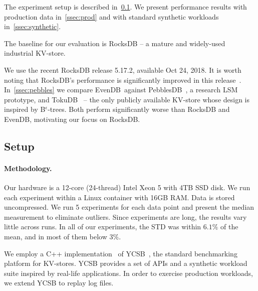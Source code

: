 \documentclass[sigplan,10pt]{acmart}
\newcommand{\remove}[1]{}
\newcommand{\sys}{EvenDB}
\begin{document}
The experiment setup is described in~\cref{ssec:setup}. 
We present performance results with production data in~\cref{ssec:prod} and with standard synthetic workloads in~\cref{ssec:synthetic}. 

The baseline for our evaluation is RocksDB -- a mature and widely-used industrial KV-store. 
\remove{RocksDB is used as storage layer of multiple popular SQL and NoSQL databases, e.g., MyRocks~\cite{MyRocks} (incarnation of MySQL) 
and MongoRocks~\cite{MongoRocks} (incarnation of MongoDB). RocksDB is an LSM-tree that is highly optimized for both read and write scenarios. 
For example, its compaction scheduling policies are highly tuned to minimize impact on mainstream data access.} 
We use the recent RocksDB release 5.17.2, available Oct 24, 2018.  It is worth noting that RocksDB's performance 
is significantly improved  in this release~\cite{CallaghanCompaction}.   
In~\cref{ssec:pebbles} we compare \sys\ against PebblesDB~\cite{PebblesDB}, a research LSM prototype, and TokuDB~\cite{TokuDB} 
-- the only publicly available KV-store whose design is inspired by B$^\epsilon$-trees. Both  perform significantly worse than RocksDB and \sys, 
motivating our focus on RocksDB.


\subsection{Setup}
\label{ssec:setup} 

\paragraph{Methodology.} 
Our hardware is a 12-core (24-thread) Intel Xeon 5  with 4TB SSD disk.  
We run each experiment within a Linux container with 16GB RAM. 
Data is stored uncompressed.
We run 5 experiments for each data point and present the median measurement to eliminate outliers. Since experiments are long, the results vary 
little across runs. In all of our experiments, the STD was within $6.1\%$ of the mean, and in most of them below $3\%$. 

We employ a C++ implementation~\cite{Cpp-YCSB} of YCSB~\cite{YCSB}, the  standard  
benchmarking platform for KV-stores. YCSB provides a set of APIs and a synthetic workload suite inspired 
by real-life applications. In order to exercise production workloads, we extend YCSB to replay log files.
\end{document}
